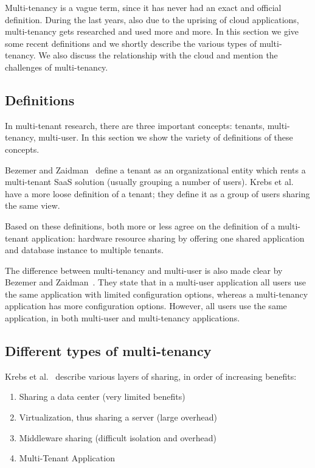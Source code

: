 Multi-tenancy is a vague term, since it has never had an exact and official definition. During the last years, also due to the uprising of cloud applications, multi-tenancy gets researched and used more and more. In this section we give some recent definitions and we shortly describe the various types of multi-tenancy. We also discuss the relationship with the cloud and mention the challenges of multi-tenancy.

\subsection{Definitions}

In multi-tenant research, there are three important concepts: tenants, multi-tenancy, multi-user. In this section we show the variety of definitions of these concepts.

Bezemer and Zaidman~\cite{bezemer2010multi} define a tenant as an organizational entity which rents a multi-tenant \ac{SaaS} solution (usually grouping a number of users). Krebs et al.~\cite{krebs2012architecture} have a more loose definition of a tenant; they define it as a group of users sharing the same view.

Based on these definitions, both more or less agree on the definition of a multi-tenant application: hardware resource sharing by offering one shared application and database instance to multiple tenants.

The difference between multi-tenancy and multi-user is also made clear by Bezemer and Zaidman~\cite{bezemer2010multi}. They state that in a multi-user application all users use the same application with limited configuration options, whereas a multi-tenancy application has more configuration options. However, all users use the same application, in both multi-user and multi-tenancy applications.

\subsection{Different types of multi-tenancy}

Krebs et al.~\cite{krebs2012architecture} describe various layers of sharing, in order of increasing benefits:
\begin{enumerate}
\item Sharing a data center (very limited benefits)
\item Virtualization, thus sharing a server (large overhead)
\item Middleware sharing (difficult isolation and overhead)
\item Multi-Tenant Application
\end{enumerate}

